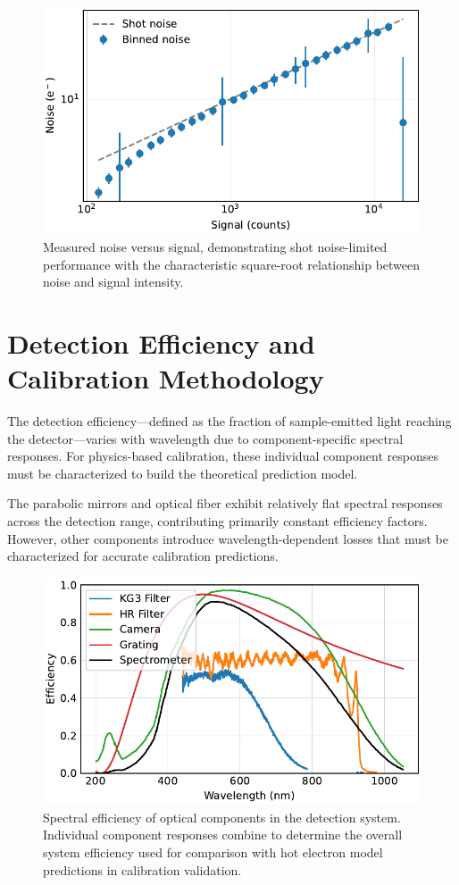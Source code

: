 \documentclass[
	parskip=half,
	a4paper,
]{scrarticle}
\begin{document}
\begin{figure}
    \centering
    \includegraphics{../analysis/figures/shot noise.pdf}
    \caption{Measured noise versus signal, demonstrating shot noise-limited performance with the characteristic square-root relationship between noise and signal intensity.}
    \label{fig:shotnoise}
\end{figure}

\section{Detection Efficiency and Calibration Methodology}

The detection efficiency—defined as the fraction of sample-emitted light reaching the detector—varies with wavelength due to component-specific spectral responses. For physics-based calibration, these individual component responses must be characterized to build the theoretical prediction model.

The parabolic mirrors and optical fiber exhibit relatively flat spectral responses across the detection range, contributing primarily constant efficiency factors. However, other components introduce wavelength-dependent losses that must be characterized for accurate calibration predictions.

\begin{figure}
    \centering
    \includegraphics{../analysis/figures/filter.pdf}
    \caption{Spectral efficiency of optical components in the detection system. Individual component responses combine to determine the overall system efficiency used for comparison with hot electron model predictions in calibration validation.}
    \label{fig:efficiency}
\end{figure}
\end{document}
